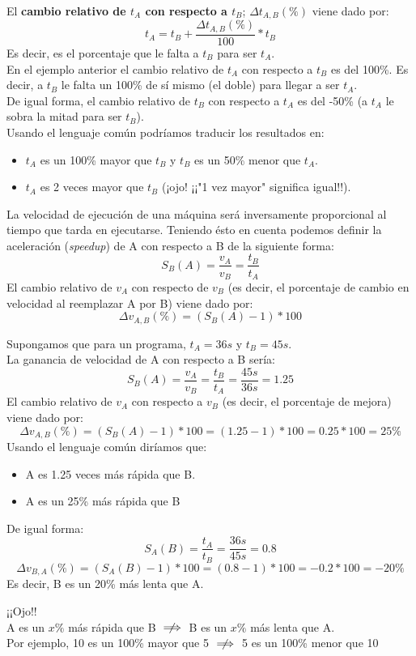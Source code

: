 \documentclass[12pt,spanish]{article}
\begin{document}
El \textbf{cambio relativo de $t_A$ con respecto a $t_B$}; $\Delta t_{A,B}(\%)$ viene dado por:
\[
t_A=t_B + \frac{\Delta t_{A,B}(\%)}{100} * t_B
\]
Es decir, es el porcentaje que le falta a $t_B$ para ser $t_A$.\\
En el ejemplo anterior el cambio relativo de $t_A$ con respecto a $t_B$ es del 100\%. Es decir, a $t_B$ le falta un 100\% de sí mismo (el doble) para llegar a ser $t_A$.\\
De igual forma, el cambio relativo de $t_B$ con respecto a $t_A$ es del -50\% (a $t_A$ le sobra la mitad para ser $t_B$).\\
Usando el lenguaje común podríamos traducir los resultados en:
\begin{itemize}
	\item $t_A$ es un 100\% mayor que $t_B$ y $t_B$ es un 50\% menor que $t_A$.
	\item $t_A$ es 2 veces mayor que $t_B$ (¡ojo! ¡¡"1 vez mayor" significa igual!!).
\end{itemize}

La velocidad de ejecución de una máquina será inversamente proporcional al tiempo que tarda en ejecutarse. Teniendo ésto en cuenta podemos definir la aceleración (\textit{speedup}) de A con respecto a B de la siguiente forma:
\[
S_B(A)=\frac{v_A}{v_B}=\frac{t_B}{t_A}
\]
El cambio relativo de $v_A$ con respecto de $v_B$ (es decir, el porcentaje de cambio en velocidad al reemplazar A por B) viene dado por:
\[
\Delta v_{A,B}(\%)=(S_B(A) -1) * 100
\]

Supongamos que para un programa, $t_A=36s$ y $t_B=45s$.\\
La ganancia de velocidad de A con respecto a B sería:
\[
S_B(A)=\frac{v_A}{v_B}=\frac{t_B}{t_A}=\frac{45 s}{36 s}=1.25
\]
El cambio relativo de $v_A$ con respecto a $v_B$ (es decir, el porcentaje de mejora) viene dado por:
\[
\Delta v_{A,B}(\%)=(S_B(A)-1) * 100 = (1.25 - 1) * 100 = 0.25 * 100 = 25\%
\]
Usando el lenguaje común diríamos que:
\begin{itemize}
	\item A es 1.25 veces más rápida que B.
	\item A es un 25\% más rápida que B
\end{itemize}
De igual forma:
\[
S_A(B)=\frac{t_A}{t_B}=\frac{36 s}{45 s}=0.8
\]
\[
\Delta v_{B,A}(\%)=(S_A(B)-1) * 100 = (0.8 - 1) * 100 = -0.2 * 100 = -20\%
\]
Es decir, B es un 20\% más lenta que A.

\begin{center}
	¡¡Ojo!! \\
	A es un $x\%$ más rápida que B $\centernot\implies$ B es un $x\%$ más lenta que A.\\
	Por ejemplo, 10 es un 100\% mayor que 5 $\centernot\implies$ 5 es un 100\% menor que 10
\end{center}
\end{document}
